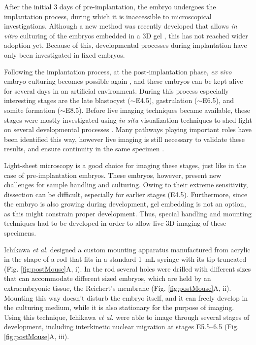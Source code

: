     After the initial 3 days of pre-implantation, the embryo undergoes the implantation process, during which it is inaccessible to microscopical investigations. Although a new method was recently developed that allows \textit{in vitro} culturing of the embryos embedded in a 3D gel \cite{panavaite_3d-geec:_2017}, this has not reached wider adoption yet. Because of this, developmental processes during implantation have only been investigated in fixed embryos.
    
    Following the implantation process, at the post-implantation phase, \textit{ex vivo} embryo culturing becomes possible again \cite{hsu_vitro_1979, huang_effect_2001}, and these embryos can be kept alive for several days in an artificial environment. During this process especially interesting stages are the late blastocyst ($\sim$E4.5), gastrulation ($\sim$E6.5), and somite formation ($\sim$E8.5). Before live imaging techniques became available, these stages were mostly investigated using \textit{in situ} visualization techniques to shed light on several developmental processes \cite{nowotschin_cellular_2010}. Many pathways playing important roles have been identified this way, however live imaging is still necessary to validate these results, and ensure continuity in the same specimen \cite{garcia_live_2011}.

    Light-sheet microscopy is a good choice for imaging these stages, just like in the case of pre-implantation embryos. These embryos, however, present new challenges for sample handling and culturing. Owing to their extreme sensitivity, dissection can be difficult, especially for earlier stages (E4.5). Furthermore, since the embryo is also growing during development, gel embedding is not an option, as this might constrain proper development. Thus, special handling and mounting techniques had to be developed in order to allow live 3D imaging of these specimens.

    Ichikawa \textit{et al.} \cite{ichikawa_live_2013} designed a custom mounting apparatus manufactured from acrylic in the shape of a rod that fits in a standard \SI{1}{mL} syringe with its tip truncated (Fig. \ref{fig:postMouse}A, i). In the rod several holes were drilled with different sizes that can accommodate different sized embryos, which are held by an extraembryonic tissue, the Reichert's membrane (Fig. \ref{fig:postMouse}A, ii). Mounting this way doesn't disturb the embryo itself, and it can freely develop in the culturing medium, while it is also stationary for the purpose of imaging. Using this technique, Ichikawa \textit{et al.} were able to image through several stages of development, including interkinetic nuclear migration at stages E5.5--6.5 (Fig. \ref{fig:postMouse}A, iii).

